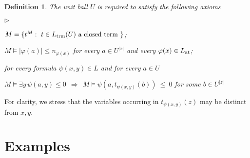 \documentclass[12pt,letterpaper,oneside,reqno]{amsart}
\newcommand{\mylabel}[1]{{#1}\hfill}
\renewenvironment{itemize}
  {\begin{list}{$\triangleright$}{%
   \setlength{\parskip}{0mm}
   \setlength{\topsep}{.2\baselineskip}
   \setlength{\rightmargin}{0mm}
   \setlength{\listparindent}{0mm}
   \setlength{\itemindent}{0mm}
   \setlength{\labelwidth}{3ex}
   \setlength{\itemsep}{.2\baselineskip}
   \setlength{\parsep}{.2\baselineskip}
   \setlength{\partopsep}{0mm}
   \setlength{\labelsep}{1ex}
   \setlength{\leftmargin}{\labelwidth+\labelsep}
   \let\makelabel\mylabel}}{%
   \end{list}}
\theoremstyle{plain}
\newtheorem{definition}[theorem]{Definition}
\theoremstyle{remark}
\begin{document}
\begin{definition}\label{def_unitball}
  The unit ball $U$ is required to satisfy the following axioms 
  \begin{itemize}
  \item[1.] $M=\{t^M:\ t\in L_{\rm trm}(U) \textrm{ a closed term } \}$;
  \item[2.] $M\models|\varphi(a)|\le n_{\varphi(x)}$ for every $a\in U^{|x|}$ and every $\varphi(x)\in L_{\rm at}$;
  \item[3.] for every formula $\psi(x,y)\in L$ and for every $a\in U$\smallskip
  
  \hfil$\displaystyle M\models\exists y\,\psi(a,y)\le0\ \ \Rightarrow\ \ M\models\psi(a,t_{\psi(x,y)}(b))\ \le\ 0$ for some $b\in U^{|z|}$
  \end{itemize}
\end{definition}

For clarity, we stress that the variables occurring in $t_{\psi(x,y)}(z)$ may be distinct from $x,y$.

\section{Examples}

\def\ceq#1#2#3{\parbox[t]{25ex}{$\displaystyle #1$}\parbox{5ex}{\hfil $#2$}{$\displaystyle #3$}}
\end{document}
